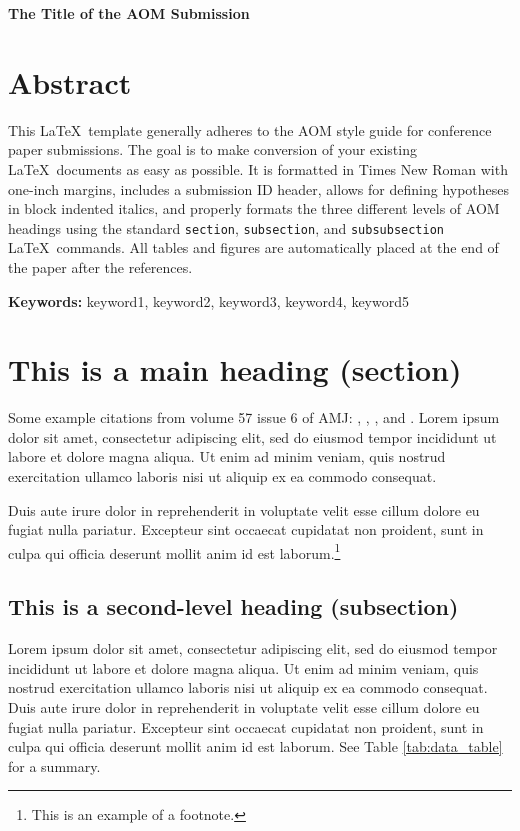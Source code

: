 \documentclass[12pt,letterpaper]{article}
\renewcommand{\title}[1]{
  	\centerline{\textbf{#1}}
  }
\begin{document}
\title{The Title of the AOM Submission}

\section{Abstract}
This \LaTeX\ template generally adheres to the AOM style guide for conference paper submissions. The goal is to make conversion of your existing \LaTeX\ documents as easy as possible. It is formatted in Times New Roman with one-inch margins, includes a submission ID header, allows for defining hypotheses in block indented italics, and properly formats the three different levels of AOM headings using the standard \texttt{section},  \texttt{subsection}, and  \texttt{subsubsection} \LaTeX\ commands. All tables and figures are automatically placed at the end of the paper after the references.

\noindent\textbf{Keywords:} keyword1, keyword2, keyword3, keyword4, keyword5
\newpage

\section{This is a main heading (section)}
  
Some example \citep{9984685820141201} citations from volume 57 issue 6 of AMJ:  \citet{9984685620141201}, \citet{9984686620141201}, \citet{9984686520141201}, and \citet{9984685820141201}. Lorem ipsum dolor sit amet, consectetur adipiscing elit, sed do eiusmod tempor incididunt ut labore et dolore magna aliqua. Ut enim ad minim veniam, quis nostrud exercitation ullamco laboris nisi ut aliquip ex ea commodo consequat.

Duis aute irure dolor in reprehenderit in voluptate velit esse cillum dolore eu fugiat nulla pariatur. Excepteur sint occaecat cupidatat non proident, sunt in culpa qui officia deserunt mollit anim id est laborum.\footnote{This is an example of a footnote.}

\subsection{This is a second-level heading (subsection)}

Lorem ipsum dolor sit amet, consectetur adipiscing elit, sed do eiusmod tempor incididunt ut labore et dolore magna aliqua. Ut enim ad minim veniam, quis nostrud exercitation ullamco laboris nisi ut aliquip ex ea commodo consequat. Duis aute irure dolor in reprehenderit in voluptate velit esse cillum dolore eu fugiat nulla pariatur. Excepteur sint occaecat cupidatat non proident, sunt in culpa qui officia deserunt mollit anim id est laborum. See Table \ref{tab:data_table} for a summary.
\end{document}
